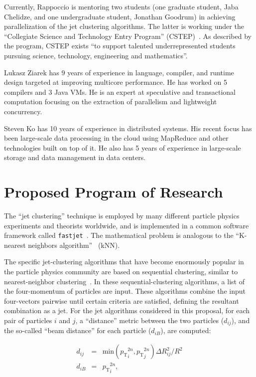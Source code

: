 \documentclass[times,11pt]{article}
\newcommand{\pt}            {\ensuremath{p_{\mathrm{T}}}\xspace}
\begin{document}
Currently, Rappoccio is mentoring two students (one graduate student,
Jaba Chelidze, and one undergraduate student, Jonathan Goodrum) in
achieving parallelization of the jet clustering algorithms. The latter
is working under the ``Collegiate Science and Technology Entry
Program'' (CSTEP)~\cite{cstep}. As described by the program, CSTEP
exists ``to support talented underrepresented students pursuing
science, technology, engineering and mathematics''. 


Lukasz Ziarek has 9 years of experience in language, compiler,
and runtime design targeted at improving multicore performance.  He
has worked on 5 compilers and 3 Java VMs. He is an expert at
speculative and transactional computation focusing on the extraction
of parallelism and lightweight concurrency. 



Steven Ko has 10 years of experience in distributed systems. His
recent focus has been large-scale data processing in the cloud using
MapReduce and other technologies built on top of it. He also has 5
years of experience in large-scale storage and data management in
data centers.


\section{Proposed Program of Research}


The
``jet clustering'' technique is employed by
many different particle physics experiments and theorists worldwide, and is
implemented in a common software framework called 
{\tt fastjet}~\cite{fastjet_manual}. 
The mathematical problem is analogous to the
``K-nearest neighbors algorithm''~\cite{knn_ieee} (kNN). 


The specific jet-clustering algorithms that have become enormously
popular in the particle physics community are based on sequential
clustering, similar to nearest-neighbor
clustering~\cite{fastjet_timing}. In these sequential-clustering
algorithms, a list of the four-momentum of particles are input. 
These algorithms combine the input four-vectors pairwise
until certain criteria are satisfied, defining the resultant
combination as a jet. 
For the jet algorithms considered in this proposal, for each pair of particles $i$ and $j$,
a ``distance'' metric between
the two particles ($d_{ij}$), and the so-called ``beam distance''
for each particle ($d_{iB}$), are computed:



\begin{eqnarray}
\label{eq:dij}
d_{ij} &=& \mathrm{min}({\pt}_i^{2n},{\pt}_j^{2n}) \Delta R_{ij}^2 / R^2 \\
\label{eq:diB}
d_{iB} &=& {\pt}_i^{2n}, 
\end{eqnarray}
\end{document}
